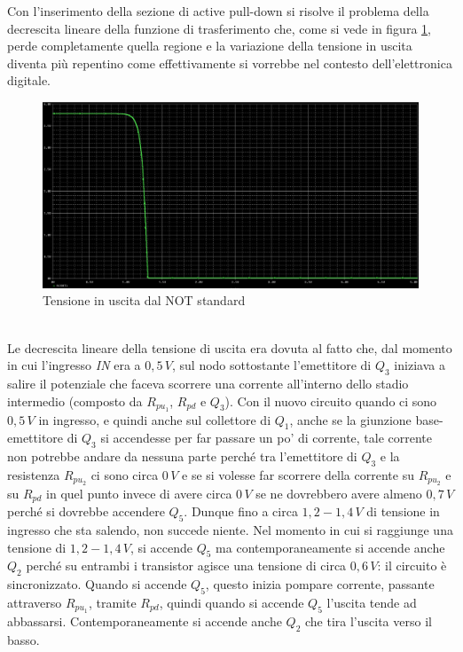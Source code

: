 \documentclass[12pt, a4paper]{report}
\begin{document}
Con l'inserimento della sezione di active pull-down si risolve il problema della decrescita lineare della funzione di trasferimento che, come si vede in figura \ref{std_transfer}, perde completamente quella regione e la variazione della tensione in uscita diventa più repentino come effettivamente si vorrebbe nel contesto dell'elettronica digitale.
\begin{figure}[h]
    \centering
    \includegraphics[scale=0.35,angle=0]{ttl_not_std_transfer.png}
    \caption{Tensione in uscita dal NOT standard}
    \label{std_transfer}
\end{figure}
\\Le decrescita lineare della tensione di uscita era dovuta al fatto che, dal momento in cui l'ingresso \textit{IN} era a $0,5\,V$, sul nodo sottostante l'emettitore di $Q_3$ iniziava a salire il potenziale che faceva scorrere una corrente all'interno dello stadio intermedio (composto da $R_{pu_{1}}$, $R_{pd}$ e $Q_3$). Con il nuovo circuito quando ci sono $0,5\,V$ in ingresso, e quindi anche sul collettore di $Q_1$, anche se la giunzione base-emettitore di $Q_3$ si accendesse per far passare un po' di corrente, tale corrente non potrebbe andare da nessuna parte perché tra l'emettitore di $Q_3$ e la resistenza $R_{pu_{2}}$ ci sono circa $0\,V$ e se si volesse far scorrere della corrente su $R_{pu_{2}}$ e su $R_{pd}$ in quel punto invece di avere circa $0\,V$ se ne dovrebbero avere almeno $0,7\,V$ perché si dovrebbe accendere $Q_5$. Dunque fino a circa $1,2 - 1,4\,V$ di tensione in ingresso che sta salendo, non succede niente. Nel momento in cui si raggiunge una tensione di $1,2 - 1,4\,V$, si accende $Q_5$ ma contemporaneamente si accende anche $Q_2$ perché su entrambi i transistor agisce una tensione di circa $0,6\,V$: il circuito è sincronizzato. Quando si accende $Q_5$, questo inizia pompare corrente, passante attraverso $R_{pu_{1}}$, tramite $R_{pd}$, quindi quando si accende $Q_5$ l'uscita tende ad abbassarsi. Contemporaneamente si accende anche $Q_2$ che tira l'uscita verso il basso.
\end{document}
